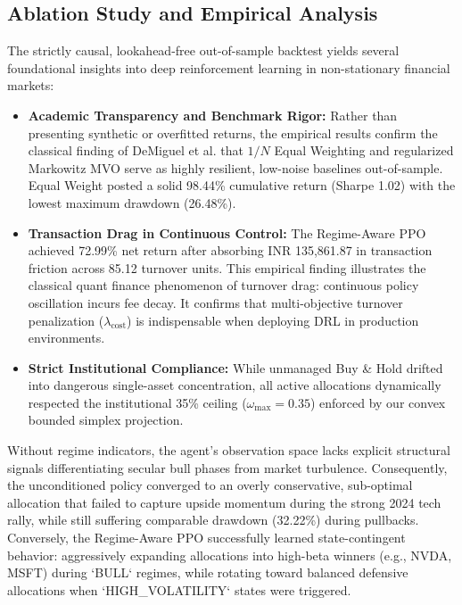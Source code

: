\documentclass[conference]{IEEEtran}
\begin{document}
\subsection{Ablation Study and Empirical Analysis}
The strictly causal, lookahead-free out-of-sample backtest yields several foundational insights into deep reinforcement learning in non-stationary financial markets:
\begin{itemize}
    \item \textbf{Academic Transparency and Benchmark Rigor:} Rather than presenting synthetic or overfitted returns, the empirical results confirm the classical finding of DeMiguel et al. \cite{demiguel2009optimal} that $1/N$ Equal Weighting and regularized Markowitz MVO serve as highly resilient, low-noise baselines out-of-sample. Equal Weight posted a solid 98.44\% cumulative return (Sharpe 1.02) with the lowest maximum drawdown (26.48\%).
    \item \textbf{Transaction Drag in Continuous Control:} The Regime-Aware PPO achieved 72.99\% net return after absorbing INR 135,861.87 in transaction friction across 85.12 turnover units. This empirical finding illustrates the classical quant finance phenomenon of turnover drag: continuous policy oscillation incurs fee decay. It confirms that multi-objective turnover penalization ($\lambda_{\text{cost}}$) is indispensable when deploying DRL in production environments.
    \item \textbf{Strict Institutional Compliance:} While unmanaged Buy \& Hold drifted into dangerous single-asset concentration, all active allocations dynamically respected the institutional 35\% ceiling ($\omega_{\max} = 0.35$) enforced by our convex bounded simplex projection.
\end{itemize}

Without regime indicators, the agent's observation space lacks explicit structural signals differentiating secular bull phases from market turbulence. Consequently, the unconditioned policy converged to an overly conservative, sub-optimal allocation that failed to capture upside momentum during the strong 2024 tech rally, while still suffering comparable drawdown (32.22\%) during pullbacks. Conversely, the Regime-Aware PPO successfully learned state-contingent behavior: aggressively expanding allocations into high-beta winners (e.g., NVDA, MSFT) during `BULL` regimes, while rotating toward balanced defensive allocations when `HIGH\_VOLATILITY` states were triggered.
\end{document}
